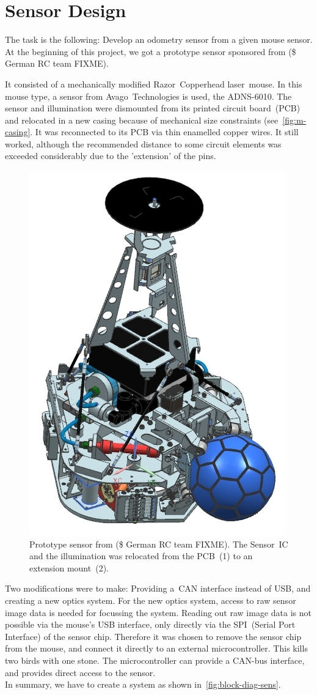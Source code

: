 \documentclass[12pt,a4paper]{article}
\begin{document}

\clearpage
\section{Sensor Design}

The task is the following: Develop an odometry sensor from a given mouse sensor.
At the beginning of this project, we got a prototype sensor sponsored from (\$ German RC team FIXME).

It consisted of a mechanically modified Razor~Copperhead laser~mouse.
In this mouse type, a sensor from Avago~Technologies is used, the ADNS-6010.
The sensor and illumination were dismounted from its printed circuit board~(PCB) and relocated in a new casing because of mechanical size constraints (see~\autoref{fig:m-casing}.
It was reconnected to its PCB via thin enamelled copper wires.
It still worked, although the recommended distance to some circuit elements was exceeded considerably due to the 'extension' of the pins.

\begin{figure}[hb]
\begin{center}  
\includegraphics[width=0.5\columnwidth]{figures/Krikkit3G.jpg}
\caption{\label{fig:m-casing}
Prototype sensor from (\$ German RC team FIXME).
The Sensor~IC and the illumination was relocated from the PCB~(1) to an extension mount~(2).
}   
\end{center}
\end{figure}

Two modifications were to make: Providing a~CAN interface instead of USB, and creating a new optics system.
For the new optics system, access to raw sensor image data is needed for focussing the system.
Reading out raw image data is not possible via the mouse's USB interface, only directly via the SPI~(Serial Port Interface) of the sensor chip.
Therefore it was chosen to remove the sensor chip from the mouse, and connect it directly to an external microcontroller.
This kills two birds with one stone.
The microcontroller can provide a CAN-bus interface, and provides direct access to the sensor.\\
In summary, we have to create a system as shown in~\autoref{fig:block-diag-sens}.
\end{document}
